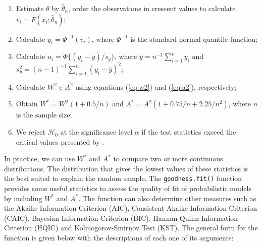 \documentclass[10pt,letterpaper]{article}
\begin{document}
\begin{enumerate}
	\item Estimate $\theta$ by $\widehat \theta_n$, order the observations in crescent values to calculate $v_i = F(x_i;\widehat \theta_n)$;
	\item Calculate $y_i = \Phi^{-1}(v_i)$, where $\Phi^{-1}$ is the standard normal quantile function;
	\item Calculate $u_i = \Phi\{(y_i-\overline{y})/s_y \}$, where $\overline{y} = n^{-1}\sum_{i=1}^{n}y_i$ and $s_y^2 = (n-1)^{-1}\sum_{i=1}^{n}(y_i-\overline{y})^2$;
	\item Calculate $W^2$ e $A^2$ using equations (\ref{eq:w2}) and (\ref{eq:a2}), respectively;
	\item Obtain $W^* = W^2(1+0.5/n)$ and $A^* = A^2(1+0.75/n+2.25/n^2)$, where $n$ is the sample size;
	\item We reject $\mathcal{H}_0$ at the significance level $\alpha$ if the test statistics exceed the critical values presented by \cite{chen1995general}.
\end{enumerate}

In practice, we can use $W^*$ and $A^*$ to compare two or more continuous distributions. The distribution that gives the lowest values
of these statistics is the best suited to explain the random sample. The \texttt{goodness.fit()} function provides some useful statistics to assess the quality
of fit of pro\-ba\-bi\-lis\-tic models by including $W^*$ and $A^*$. The function can also determine other measures such as the Akaike Information
Criterion (AIC), Consistent Akaike Information Criterion (CAIC), Bayesian Information Criterion (BIC), Hannan-Quinn Information Criterion (HQIC)
and Kolmogorov-Smirnov Test (KST). The general form for the function is given below with the descriptions of each one of its arguments:
\end{document}
